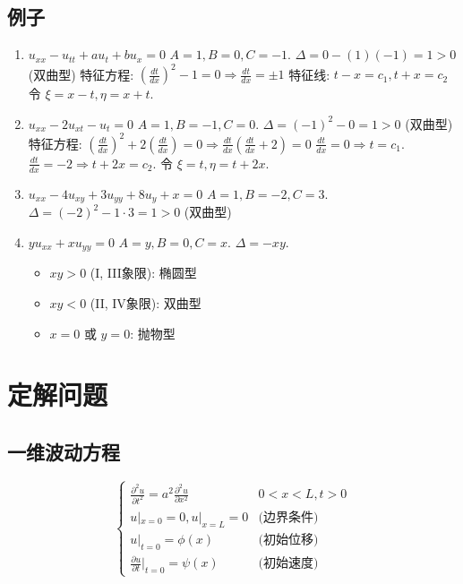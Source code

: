 \documentclass{article}
\begin{document}
	\subsection*{例子}
	\begin{enumerate}
		\item $u_{xx} - u_{t t} + a u_t + b u_x = 0$
		$A=1, B=0, C=-1$. $\Delta = 0 - (1)(-1) = 1 > 0$ (双曲型)
		特征方程: $(\frac{dt}{dx})^2 - 1 = 0 \Rightarrow \frac{dt}{dx} = \pm 1$
		特征线: $t-x=c_1, t+x=c_2$
		令 $\xi = x-t, \eta=x+t$.
		
		\item $u_{xx} - 2u_{xt} - u_t = 0$
		$A=1, B=-1, C=0$. $\Delta = (-1)^2 - 0 = 1 > 0$ (双曲型)
		特征方程: $(\frac{dt}{dx})^2 + 2(\frac{dt}{dx}) = 0 \Rightarrow \frac{dt}{dx}( \frac{dt}{dx}+2) = 0$
		$\frac{dt}{dx}=0 \Rightarrow t=c_1$.
		$\frac{dt}{dx}=-2 \Rightarrow t+2x=c_2$.
		令 $\xi = t, \eta=t+2x$.
		
		\item $u_{xx} - 4u_{xy} + 3u_{yy} + 8u_y + x = 0$
		$A=1, B=-2, C=3$. $\Delta = (-2)^2 - 1 \cdot 3 = 1 > 0$ (双曲型)
		
		\item $y u_{xx} + x u_{yy} = 0$
		$A=y, B=0, C=x$. $\Delta = -xy$.
		\begin{itemize}
			\item $xy>0$ (I, III象限): 椭圆型
			\item $xy<0$ (II, IV象限): 双曲型
			\item $x=0$ 或 $y=0$: 抛物型
		\end{itemize}
	\end{enumerate}
	
	\section*{定解问题}
	
	\subsection*{一维波动方程}
	$$ \begin{cases}
		\frac{\partial^2 u}{\partial t^2} = a^2 \frac{\partial^2 u}{\partial x^2} & 0 < x < L, t>0 \\
		u|_{x=0}=0, u|_{x=L}=0 & \text{(边界条件)} \\
		u|_{t=0}=\phi(x) & \text{(初始位移)} \\
		\frac{\partial u}{\partial t}|_{t=0}=\psi(x) & \text{(初始速度)}
	\end{cases} $$
	
\end{document}
